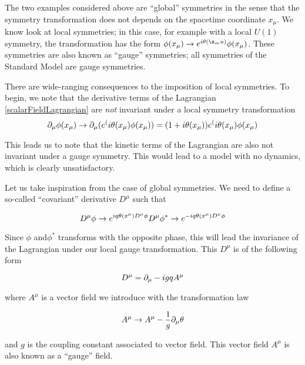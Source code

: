 The two examples considered above are ``global'' symmetries in the sense that the symmetry transformation does not depends on the spacetime coordinate $x_\mu$.
We know look at local symmetries; in this case, for example with a local $U(1)$ symmetry,  the transformation has the form $\phi(x_\mu) \rightarrow e^{i \theta(\x_mu)} \phi(x_\mu)$.
These symmetries are also known as ``gauge'' symmetries; all symmetries of the Standard Model are gauge symmetries.

There are wide-ranging consequences to the imposition of local symmetries.
To begin, we note that the derivative terms of the Lagrangian \ref{scalarFieldLagrangian} are \textit{not} invariant under a local symmetry transformation
\begin{equation}
\partial_\mu \phi(x_\mu) \rightarrow \partial_\mu ( e^(i\theta(x_\mu) \phi(x_\mu )) = (1 + i \theta(x_\mu) ) e^(i\theta(x_\mu) \phi(x_\mu )
\end{equation}

This leads us to note that the kinetic terms of the Lagrangian are also not invariant under a gauge symmetry.
This would lead to a model with no dynamics, which is clearly unsatisfactory.

Let us take inspiration from the case of global symmetries.
We need to define a so-called ``covariant'' derivative $D^\mu$ such that

\begin{equation}
D^\mu \phi   \rightarrow e^{ i q \theta(x^\mu) D^\mu \phi} \\
D^\mu \phi^* \rightarrow e^{-i q \theta(x^\mu) D^\mu \phi} \\
\end{equation}

Since $\phi$ and$\phi^*$ transforms with the opposite phase, this will lead the invariance of the Lagrangian under our local gauge transformation.
This $D^\mu$ is of the following form

\begin{equation}
D^\mu = \partial_\mu - i g q A^\mu
\end{equation}

where $A^\mu$ is a vector field we introduce with the transformation law

\begin{equation}
A^\mu \rightarrow A^\mu - \frac{1}{g} \partial_\mu \theta
\end{equation}

and $g $ is the coupling constant associated to vector field.
This vector field $A^\mu$ is also known as a ``gauge'' field.


